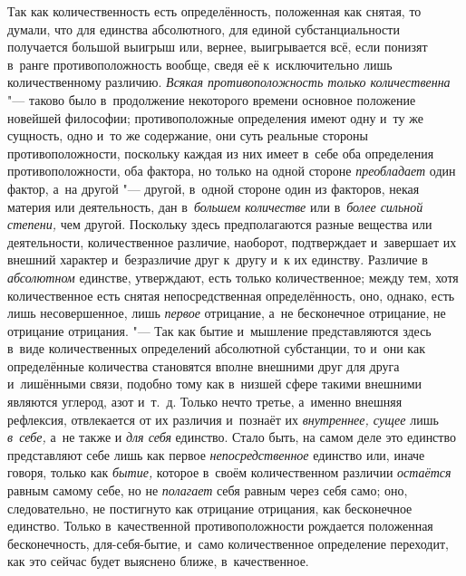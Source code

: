 \label{bkm:bm69a}Так как количественность есть определённость, положенная как
снятая, то думали, что для единства абсолютного, для единой субстанциальности
получается большой выигрыш или, вернее, выигрывается всё, если понизят в~ранге
противоположность вообще, сведя её к~исключительно лишь количественному
различию. {\em Всякая противоположность только количественна} "--- таково было
в~продолжение некоторого времени основное положение новейшей
философии; противоположные определения
имеют одну и~ту же сущность, одно и~то же содержание, они суть реальные стороны
противоположности, поскольку каждая из них имеет в~себе оба определения
противоположности, оба фактора, но только на одной стороне {\em преобладает}
один фактор, а~на другой "--- другой, в~одной стороне один из факторов, некая
материя или деятельность, дан в~{\em большем количестве} или
в~{\em более сильной степени,} чем другой. Поскольку здесь предполагаются
разные вещества или деятельности, количественное различие, наоборот,
подтверждает и~завершает их внешний характер и~безразличие друг к~другу и~к их
единству. Различие в {\em абсолютном} единстве, утверждают, есть только
количественное; между тем, хотя количественное есть снятая непосредственная
определённость, оно, однако, есть лишь несовершенное, лишь {\em первое}
отрицание, а~не бесконечное отрицание, не отрицание отрицания. "--- Так как
бытие и~мышление представляются здесь в~виде количественных определений
абсолютной субстанции, то и~они как определённые количества становятся вполне
внешними друг для друга и~лишёнными связи, подобно тому как в~низшей сфере
такими внешними являются углерод, азот и~т.~д. Только нечто третье, а~именно
внешняя рефлексия, отвлекается от их различия и~познаёт их
{\em внутреннее, сущее} лишь {\em в~себе,} а~не также и {\em для себя}
единство. Стало быть, на самом деле это единство представляют себе лишь как
первое {\em непосредственное} единство или, иначе говоря, только как
{\em бытие,} которое в~своём количественном различии {\em остаётся} равным
самому себе, но не {\em полагает} себя равным через себя само; оно,
следовательно, не постигнуто как отрицание отрицания, как бесконечное единство.
Только в~качественной противоположности рождается положенная бесконечность,
для-себя-бытие, и~само количественное определение переходит, как это сейчас
будет выяснено ближе, в~качественное.


